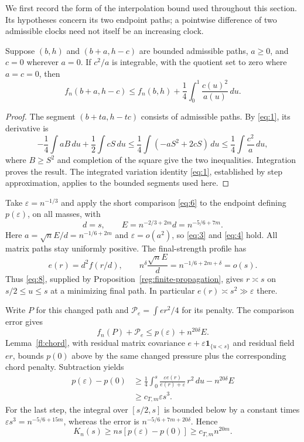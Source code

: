 We first record the form of the interpolation bound used throughout
this section.  Its hypotheses concern its two endpoint paths; a
pointwise difference of two admissible clocks need not itself be an
increasing clock.

\begin{lemma}\label{fl:chord}
Suppose $(b,h)$ and $(b+a,h-c)$ are bounded admissible paths,
$a\ge0$, and $c=0$ wherever $a=0$.  If $c^2/a$ is integrable, with
the quotient set to zero where $a=c=0$, then
\[
 f_n(b+a,h-c)\le f_n(b,h)+\frac14\int_0^1\frac{c(u)^2}{a(u)}\,du.
\]
\end{lemma}

\begin{proof}
The segment $(b+ta,h-tc)$ consists of admissible paths.  By
\eqref{eq:1}, its derivative is
\[
 -\frac14\int aB\,du+\frac12\int cS\,du
 \le\frac14\int(-aS^2+2cS)\,du
 \le\frac14\int\frac{c^2}{a}\,du,
\]
where $B\ge S^2$ and completion of the square give the two inequalities.
Integration proves the result.  The integrated variation identity
\eqref{eq:1}, established by step approximation, applies to the
bounded segments used here.
\end{proof}

Take $\varepsilon=n^{-1/3}$ and apply the short comparison
\eqref{eq:6} to the endpoint defining $p(\varepsilon)$, on all masses,
with
\[
 d=s,\qquad E=n^{-2/3+2m}d=n^{-5/6+7m}.
\]
Here $a=\sqrt n E/d=n^{-1/6+2m}$ and
$\varepsilon=o(a^2)$, so \eqref{eq:3} and \eqref{eq:4} hold.
All matrix paths stay uniformly positive.  The final-strength profile
has
\[
 e(r)=d^2f(r/d),\qquad
 n^\delta\frac{\sqrt n E}{d}=n^{-1/6+2m+\delta}=o(s).
\]
Thus \eqref{eq:8}, supplied by Proposition~\ref{reg:finite-propagation},
gives $r\asymp s$ on $s/2\le u\le s$ at a minimizing final path.
In particular $e(r)\asymp s^2\gg\varepsilon$ there.

Write $P$ for this changed path and $\mathcal P_e=\int er^2/4$ for
its penalty.  The comparison error gives
\[
 f_n(P)+\mathcal P_e\le p(\varepsilon)+n^{20\delta}E.
\]
Lemma~\ref{fl:chord}, with residual matrix covariance
$e+\varepsilon\mathbf1_{\{u<s\}}$ and residual field $er$, bounds
$p(0)$ above by the same changed pressure plus the corresponding
chord penalty.  Subtraction yields
\begin{equation}
\begin{split}
 p(\varepsilon)-p(0)
 &\ge\frac14\int_0^s
       \frac{\varepsilon e(r)}{e(r)+\varepsilon}\,r^2\,du
           -n^{20\delta}E\\
 &\ge c_{T,m}\varepsilon s^3.
\end{split}\tag{30}\label{eq:30}
\end{equation}
For the last step, the integral over $[s/2,s]$ is bounded below by a
constant times $\varepsilon s^3=n^{-5/6+15m}$, whereas the error is
$n^{-5/6+7m+20\delta}$.  Hence
\[
 K_n(s)\ge ns[p(\varepsilon)-p(0)]\ge c_{T,m}n^{20m}.
\]

